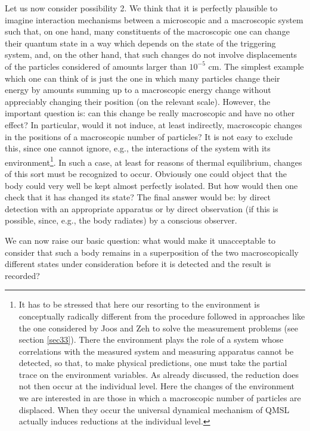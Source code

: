 \documentclass[10pt,a4paper]{article}
\begin{document}
Let us now consider possibility 2. We think that it is perfectly
plausible to imagine interaction mechanisms between a microscopic
and a macroscopic system such that, on one hand, many constituents
of the macroscopic one can change their quantum state in a way
which depends on the state of the triggering system, and, on the
other hand, that such changes do not involve displacements of the
particles considered of amounts larger than $10^{-5}$ cm. The
simplest example which one can think of is just the one in which
many particles change their energy by amounts summing up to a
macroscopic energy change without appreciably changing their
position (on the relevant scale). However, the important question
is: can this change be really macroscopic and have no other
effect? In particular, would it not induce, at least indirectly,
macroscopic changes in the positions of a macroscopic number of
particles? It is not easy to exclude this, since one cannot
ignore, e.g., the interactions of the system with its
environment\footnote{It has to be stressed that here our resorting
to the environment is conceptually radically different from the
procedure followed in approaches like the one considered by Joos
and Zeh \cite{jz} to solve the measurement problems (see section
\ref{sec33}). There the environment plays the role of a system
whose correlations with the measured system and measuring
apparatus cannot be detected, so that, to make physical
predictions, one must take the partial trace on the environment
variables. As already discussed, the reduction does not then occur
at the individual level. Here the changes of the environment we
are interested in are those in which a macroscopic number of
particles are displaced. When they occur the universal dynamical
mechanism of QMSL actually induces reductions at the individual
level.}. In such a case, at least for reasons of thermal
equilibrium, changes of this sort must be recognized to occur.
Obviously one could object that the body could very well be kept
almost perfectly isolated. But how would then one check that it
has changed its state? The final answer would be: by direct
detection with an appropriate apparatus or by direct observation
(if this is possible, since, e.g., the body radiates) by a
conscious observer.

We can now raise our basic question: what would make it
unacceptable to consider that such a body remains in a
superposition of the two macroscopically different states under
consideration before it is detected and the result is recorded?
\end{document}
